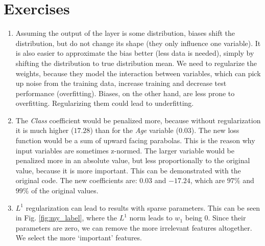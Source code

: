 \def\pathToRoot{.}


\def\issolution{}




\section*{Exercises}

\newcommand{\TODO}[1]{\textcolor{red}{TODO:#1}}

\begin{exercise}

\begin{enumerate}
    \item Assuming the output of the layer is some distribution, biases shift the distribution, but do not change its shape (they only influence one variable). It is also easier to approximate the bias better (less data is needed), simply by shifting the distribution to true distribution mean. We need to regularize the weights, because they model the interaction between variables, which can pick up noise from the training data, increase training and decrease test performance (overfitting). Biases, on the other hand, are less prone to overfitting. Regularizing them could lead to underfitting.
    \item The \textit{Class} coefficient would be penalized more, because without regularization it is much higher ($17.28$) than for the \textit{Age} variable ($0.03$). The new loss function would be a sum of upward facing parabolas. This is the reason why input variables are sometimes z-normed. The larger variable would be penalized more in an absolute value, but less proportionally to the original value, because it is more important. This can be demonstrated with the original code. The new coefficients are: $0.03$ and $-17.24$, which are $97\%$ and $99\%$ of the original values.
    \item $L^1$ regularization can lead to results with sparse parameters. This can be seen in Fig. \ref{fig:my_label}, where the $L^1$ norm leads to $w_1$ being 0. Since their parameters are zero, we can remove the more irrelevant features altogether. We select the more `important' features. 

\end{enumerate}
\end{exercise}
